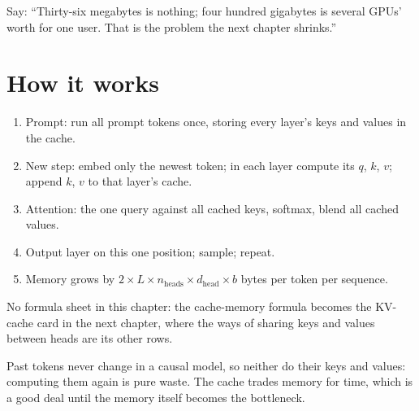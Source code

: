 \begin{sayit}
\begin{pic}
\end{pic}
Say: ``Thirty-six megabytes is nothing; four hundred gigabytes is several GPUs' worth for one user. That is the problem the next chapter shrinks.''
\end{sayit}

\section{How it works}
\begin{enumerate}
  \item Prompt: run all prompt tokens once, storing every layer's keys and values in the cache.
  \item New step: embed only the newest token; in each layer compute its $q$, $k$, $v$; append $k$, $v$ to that layer's cache.
  \item Attention: the one query against all cached keys, softmax, blend all cached values.
  \item Output layer on this one position; sample; repeat.
  \item Memory grows by $2 \times L \times n_{\text{heads}} \times d_{\text{head}} \times b$ bytes per token per sequence.
\end{enumerate}

No formula sheet in this chapter: the cache-memory formula becomes the KV-cache card in the next chapter, where the ways of sharing keys and values between heads are its other rows.

\begin{intuition}
Past tokens never change in a causal model, so neither do their keys and values: computing them again is pure waste. The cache trades memory for time, which is a good deal until the memory itself becomes the bottleneck.
\end{intuition}

